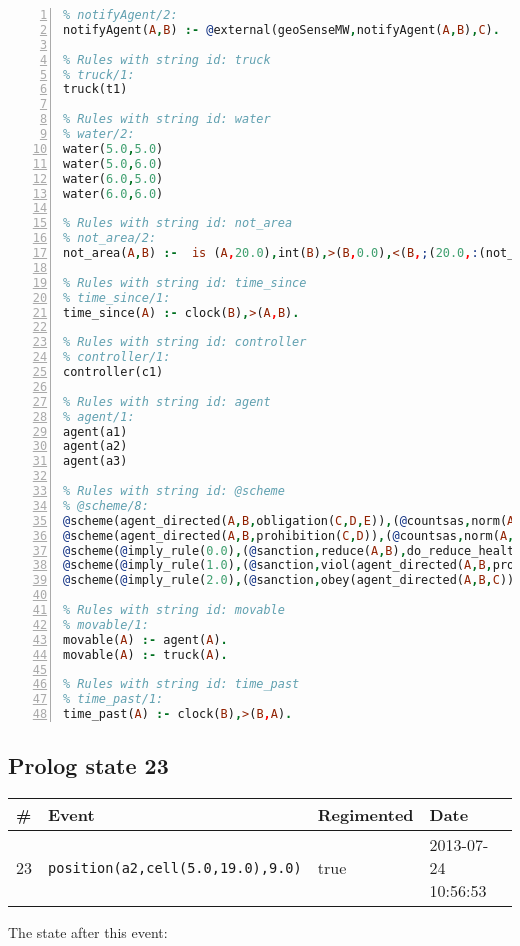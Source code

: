 \documentclass[11pt]{article}\usepackage[utf8]{inputenc}\usepackage{geometry}
\begin{document}
\begin{lstlisting}[language=Prolog, numbers=left]
% Rules with string id: notifyAgent
% notifyAgent/2:
notifyAgent(A,B) :- @external(geoSenseMW,notifyAgent(A,B),C).

% Rules with string id: truck
% truck/1:
truck(t1)

% Rules with string id: water
% water/2:
water(5.0,5.0)
water(5.0,6.0)
water(6.0,5.0)
water(6.0,6.0)

% Rules with string id: not_area
% not_area/2:
not_area(A,B) :-  is (A,20.0),int(B),>(B,0.0),<(B,;(20.0,:(not_area(A,B), is (-(B),20.0)))),int(A),>(A,0.0),<(A,;(20.0,:(area(A,B),-(int(A))))),int(B),>(A,0.0),>(B,0.0),<(A,21.0),<(B,21.0).

% Rules with string id: time_since
% time_since/1:
time_since(A) :- clock(B),>(A,B).

% Rules with string id: controller
% controller/1:
controller(c1)

% Rules with string id: agent
% agent/1:
agent(a1)
agent(a2)
agent(a3)

% Rules with string id: @scheme
% @scheme/8:
@scheme(agent_directed(A,B,obligation(C,D,E)),(@countsas,norm(A,B,F,obligation(C,D,E)),F),false,(listTrue(C)),(time_past(D)),false,[plus(viol(agent_directed(A,B,obligation(C,D,E))))|[]],[plus(obey(agent_directed(A,B,obligation(C,D,E))))|[]])
@scheme(agent_directed(A,B,prohibition(C,D)),(@countsas,norm(A,B,E,prohibition(C,D)),E),(listTrue(C)),false,(false),false,[plus(viol(agent_directed(A,B,prohibition(C,D))))|[]],[plus(obey(agent_directed(A,B,prohibition(C,D))))|[]])
@scheme(@imply_rule(0.0),(@sanction,reduce(A,B),do_reduce_health(A,B),notifyAgent(A,changed(status))),true,false,false,false,[min(reduce(A,B))|[]],[])
@scheme(@imply_rule(1.0),(@sanction,viol(agent_directed(A,B,prohibition(C,D))),do_sanction(D)),true,false,false,false,[min(viol(agent_directed(A,B,prohibition(C,D))))|[]],[])
@scheme(@imply_rule(2.0),(@sanction,obey(agent_directed(A,B,C))),true,false,false,false,[min(obey(agent_directed(A,B,C)))|[]],[])

% Rules with string id: movable
% movable/1:
movable(A) :- agent(A).
movable(A) :- truck(A).

% Rules with string id: time_past
% time_past/1:
time_past(A) :- clock(B),>(B,A).

\end{lstlisting}
\clearpage 
\subsection{Prolog state 23}
\begin{table}[ht]
\centering 
\begin{tabular}{l l l l} 
\textbf{\#} & \textbf{Event} & \textbf{Regimented} & \textbf{Date} \\ [0.5ex] 
\hline
23&\texttt{position(a2,cell(5.0,19.0),9.0)}&true&2013-07-24 10:56:53\\ [1ex] \hline\end{tabular}
\end{table}
The state after this event:
\end{document}
